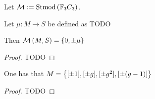 \begin{definition}
    Let \( {\mathcal{M}} := \operatorname{Stmod}\left(  {\mathbb{F}}_3C_3  \right) \).
\end{definition}

\begin{lemma} \label{thm:f_3c_3_mu}
    Let \( \mu: M \to S \) be defined as TODO

    Then \( {\mathcal{M}}\left( M, S \right) = \left\{ 0, \pm\mu \right\} \)
\end{lemma}
\begin{proof}
    TODO
\end{proof}

\begin{lemma} \label{lem:classify_m}
    One has that \( M = \left\{ [\pm 1], [\pm g], [\pm g^2], [\pm (g - 1)] \right\} \)
\end{lemma}
\begin{proof}
    TODO
\end{proof}

